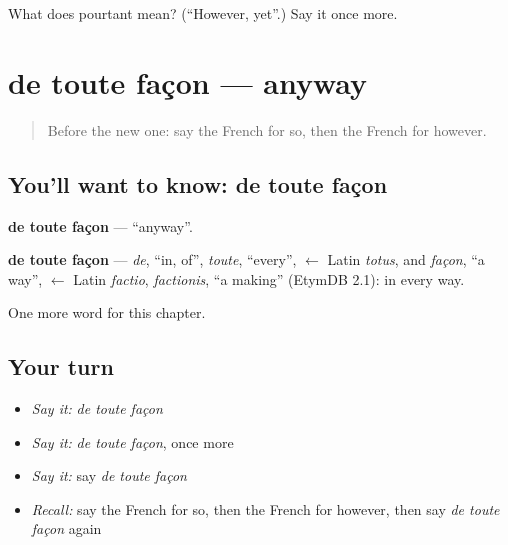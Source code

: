 \begin{tcolorbox}[breakable,colback=teal!4,colframe=teal!35!black,title={Before you move on}]
What does pourtant mean? (\textquotedblleft{}However, yet\textquotedblright{}.) Say it once more.
\end{tcolorbox}
\section[de toute façon]{de toute façon — anyway}

\label{lesson:FR-C158-de-toute-facon}



\begin{quote}
Before the new one: say the French for so, then the French for however.
\end{quote}

\subsection*{You'll want to know: de toute façon}
\textbf{de toute façon} — \textquotedblleft{}anyway\textquotedblright{}.

\begin{cousinweb}
\textbf{de toute façon} — \emph{de}, \textquotedblleft{}in, of\textquotedblright{}, \emph{toute}, \textquotedblleft{}every\textquotedblright{}, $\leftarrow$ Latin \emph{totus}, and \emph{façon}, \textquotedblleft{}a way\textquotedblright{}, $\leftarrow$ Latin \emph{factio}, \emph{factionis}, \textquotedblleft{}a making\textquotedblright{} (EtymDB 2.1): in every way.
\end{cousinweb}

\begin{grammarlens}[title={What you've built}]
One more word for this chapter.
\end{grammarlens}

\subsection*{Your turn}
\begin{itemize}
\raggedright
  \item \emph{Say it:} \emph{de toute façon}
  \item \emph{Say it:} \emph{de toute façon}, once more
  \item \emph{Say it:} say \emph{de toute façon}
  \item \emph{Recall:} say the French for so, then the French for however, then say \emph{de toute façon} again
\end{itemize}

